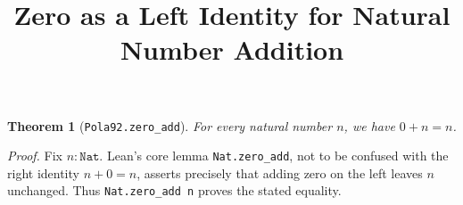 \documentclass{article}
\title{Zero as a Left Identity for Natural Number Addition}
\author{}
\date{}
\newtheorem{theorem}{Theorem}
\begin{document}
\maketitle

\begin{theorem}[\texttt{Pola92.zero\_add}]
For every natural number $n$, we have $0 + n = n$.
\end{theorem}

\noindent\textit{Proof.}
Fix $n : \mathtt{Nat}$. Lean's core lemma \texttt{Nat.zero\_add},
not to be confused with the right identity $n + 0 = n$,
asserts precisely that adding zero on the left leaves $n$ unchanged.
Thus \texttt{Nat.zero\_add n} proves the stated equality.
\end{document}
